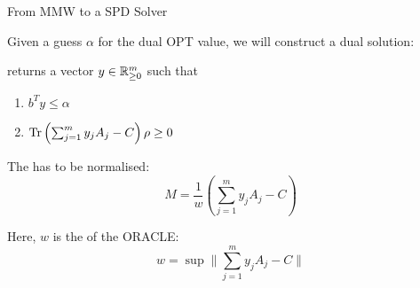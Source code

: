 \begin{frame}{From MMW to a SPD Solver}

Given a guess $\alpha$ for the dual OPT value, we will construct a dual solution:

\vspace{\floatsep}

\structure{$\oracle(\rho)$} returns a vector $y\in\mathbb{R}^m_{\geq 0}$ such that
\begin{enumerate}
 \item $b^Ty \leq \alpha$
 \item$\operatorname{Tr}\left(\sum_{j=1}^m y_j A_j - C \right)\rho  \geq 0$
\end{enumerate}

\vspace{\floatsep}

The  has to be normalised:
\begin{equation*}
 M = \frac{1}{w} \left( \sum_{j=1}^m y_j A_j - C \right)
\end{equation*}



Here, $w$ is the  of the ORACLE:
\begin{equation*}
 w = \sup \bigg\| \sum_{j=1}^m y_j A_j - C  \bigg\|
\end{equation*}


\end{frame}

